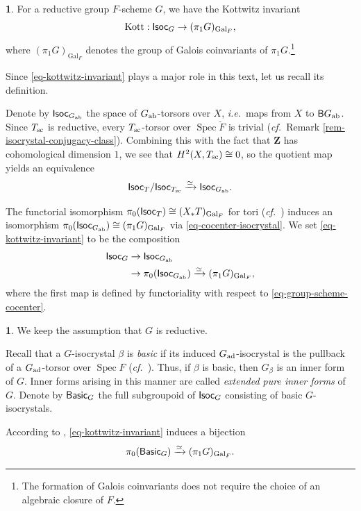 \documentclass[10pt,english,reqno]{amsart}
\newcommand{\integers}{\mathbf Z}
\newcommand{\Isoc}{\textnormal{\textsf{Isoc}}}
\newcommand{\Basic}{\textnormal{\textsf{Basic}}}
\newcommand{\Gal}{\operatorname{Gal}}
\newcommand{\Kottwitz}{\textnormal{Kott}}
\newcommand{\deloop}{\textnormal{\textsf{B}}}
\newcommand{\Spec}{\operatorname{Spec}}
\newcommand{\sconn}{\textnormal{sc}}
\newcommand{\adjoint}{\textnormal{ad}}
\newcommand{\abelian}{\textnormal{ab}}
\theoremstyle{definition}
\numberwithin{equation}{section}
\newtheorem{untitledsubsubsection}[subsubsection]{}
\newenvironment{void}
{\begin{untitledsubsubsection}}
{\end{untitledsubsubsection}}
\begin{document}

\begin{void}
\label{void-kottwitz-invariant}
For a reductive group $F$-scheme $G$, we have the Kottwitz invariant
\begin{equation}
\label{eq-kottwitz-invariant}
\Kottwitz : \Isoc_G \rightarrow (\pi_1G)_{\Gal_F},
\end{equation}
where $(\pi_1 G)_{\Gal_F}$ denotes the group of Galois coinvariants of $\pi_1 G$.\footnote{The formation of Galois coinvariants does not require the choice of an algebraic closure of $F$.}

Since \eqref{eq-kottwitz-invariant} plays a major role in this text, let us recall its definition.

Denote by $\Isoc_{G_{\abelian}}$ the space of $G_{\abelian}$-torsors over $X$, \emph{i.e.}~maps from $X$ to $\deloop G_{\abelian}$. Since $T_{\sconn}$ is reductive, every $T_{\sconn}$-torsor over $\Spec\breve F$ is trivial (\emph{cf.}~Remark \ref{rem-isocrystal-conjugacy-class}). Combining this with the fact that $\integers$ has cohomological dimension $1$, we see that $H^2(X, T_{\sconn}) \cong 0$, so the quotient map yields an equivalence
\begin{equation}
\label{eq-cocenter-isocrystal}
\Isoc_T/\Isoc_{T_{\sconn}} \xrightarrow{\simeq} \Isoc_{G_{\abelian}}.
\end{equation}

The functorial isomorphism $\pi_0(\Isoc_T) \cong (X_*T)_{\Gal_F}$ for tori (\emph{cf.}~\cite[\S2.4]{MR809866}) induces an isomorphism $\pi_0(\Isoc_{G_{\abelian}}) \cong (\pi_1 G)_{\Gal_F}$ via \eqref{eq-cocenter-isocrystal}. We set \eqref{eq-kottwitz-invariant} to be the composition
\begin{align*}
\Isoc_G &\rightarrow \Isoc_{G_{\abelian}} \\
& \rightarrow \pi_0 (\Isoc_{G_{\abelian}}) \xrightarrow{\simeq} (\pi_1 G)_{\Gal_F},
\end{align*}
where the first map is defined by functoriality with respect to \eqref{eq-group-scheme-cocenter}.
\end{void}


\begin{void}
We keep the assumption that $G$ is reductive.

Recall that a $G$-isocrystal $\beta$ is \emph{basic} if its induced $G_{\adjoint}$-isocrystal is the pullback of a $G_{\adjoint}$-torsor over $\Spec F$ (\emph{cf.}~\cite[\S4.5, \S5.1]{MR809866}). Thus, if $\beta$ is basic, then $G_{\beta}$ is an inner form of $G$. Inner forms arising in this manner are called \emph{extended pure inner forms} of $G$. Denote by $\Basic_G$ the full subgroupoid of $\Isoc_G$ consisting of basic $G$-isocrystals.

According to \cite[Proposition 5.6]{MR809866}, \eqref{eq-kottwitz-invariant} induces a bijection
\begin{equation}
\label{eq-basic-isocrystal-kottwitz-invariant-bijection}
\pi_0(\Basic_G) \xrightarrow{\simeq} (\pi_1 G)_{\Gal_F}.
\end{equation}
\end{void}
\end{document}
